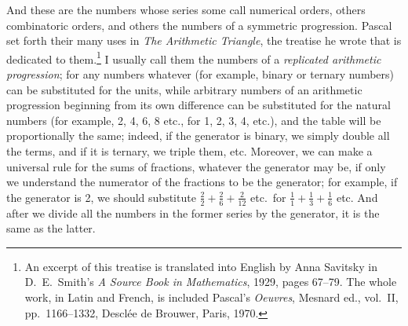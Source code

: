 \documentclass[polutonikogreek,english,twoside,openright]{article}
\begin{document}
And these are the numbers whose series some call numerical orders, others
combinatoric orders, and others the numbers of a symmetric progression.
Pascal set forth their many uses in {\em The Arithmetic Triangle},
the treatise he wrote that is dedicated to them.\footnote{An excerpt of this treatise is translated into English by Anna Savitsky in D.\ E.\ Smith's {\em A Source Book in Mathematics}, 1929, pages 67--79.  The whole work, in Latin and French, is included Pascal's {\em Oeuvres}, Mesnard ed., vol.\ II, pp.\ 1166--1332, Descl\'ee de Brouwer, Paris, 1970.} I usually call them the
numbers of a {\em replicated arithmetic progression}; for any numbers whatever
(for example, binary or ternary numbers) can be substituted for the units,
while arbitrary numbers of an arithmetic progression beginning from its own
difference can be substituted for the natural numbers (for example, 2, 4, 6, 8
etc., for 1, 2, 3, 4, etc.), and the table will be proportionally the same;
indeed, if the generator is binary, we simply double all the terms, and if it
is ternary, we triple them, etc.  Moreover, we can make a universal rule for
the sums of fractions, whatever the generator may be, if only we understand
the numerator of the fractions to be the generator; for example, if the
generator is 2, we should substitute $\frac{2}{2} +\frac{2}{6} +\frac{2}{12}$
etc.\ for $\frac{1}{1} +\frac{1}{3} + \frac{1}{6}$ etc.  And after we divide
all the numbers in the former series by the generator, it is the same as the
latter.  
\end{document}
